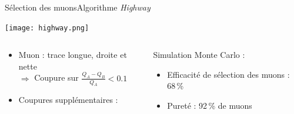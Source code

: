     \begin{frame}{Sélection des muons}{Algorithme \textit{Highway}}
        \begin{scriptsize}
        \texttt{[image: highway.png]}
        \begin{columns}
            \begin{column}{0.5\textwidth}
                \begin{itemize}
                    \item Muon : trace longue, droite et nette \\ $\Rightarrow$ Coupure sur $\frac{Q_A-Q_B}{Q_A} < 0.1$
                    \item Coupures supplémentaires : \begin{itemize}\end{itemize}
                \end{itemize}
            \end{column}
            \begin{column}{0.5\textwidth}
                \hspace{0.3cm} Simulation Monte Carlo :
                \begin{itemize}
                    \item Efficacité de sélection des muons : 68\,\%
                    \item Pureté : 92\,\% de muons
                \end{itemize}
            \end{column}
        \end{columns}
        \end{scriptsize}
    \end{frame}
    
